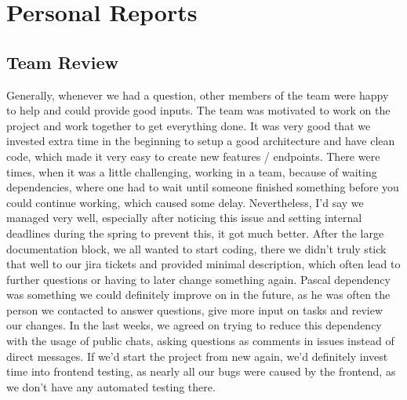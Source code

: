 \chapter{Personal Reports}

\section{Team Review}
Generally, whenever we had a question, other members of the team were happy to help and could provide good inputs.
The team was motivated to work on the project and work together to get everything done.
It was very good that we invested extra time in the beginning to setup a good architecture and have clean code, which made it very easy to create new features / endpoints.
There were times, when it was a little challenging, working in a team, because of waiting dependencies, where one had to wait until someone finished something before you could continue working, which caused some delay.
Nevertheless, I'd say we managed very well, especially after noticing this issue and setting internal deadlines during the spring to prevent this, it got much better.
After the large documentation block, we all wanted to start coding, there we didn't truly stick that well to our jira tickets and provided minimal description, which often lead to further questions or having to later change something again.
Pascal dependency was something we could definitely improve on in the future, as he was often the person we contacted to answer questions, give more input on tasks and review our changes.
In the last weeks, we agreed on trying to reduce this dependency with the usage of public chats, asking questions as comments in issues instead of direct messages.
If we'd start the project from new again, we'd definitely invest time into frontend testing, as nearly all our bugs were caused by the frontend, as we don't have any automated testing there.